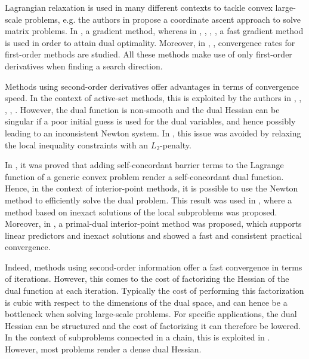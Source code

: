 
Lagrangian relaxation is used in many different contexts to tackle convex large-scale problems, e.g. the authors in \cite{Cottle1986} propose a coordinate ascent approach to solve matrix problems. In \cite{Lasdon1970}, \cite{Giselsson2010} a gradient method, whereas in \cite{Richter2011}, \cite{Necoara2011}, \cite{Giselsson2013}, \cite{Giselsson2014a}, \cite{Giselsson2014b} a fast gradient method is used in order to attain dual optimality. Moreover, in \cite{Necoara2014a}, \cite{Necoara2014b}, convergence rates for first-order methods are studied. All these methods make use of only first-order derivatives when finding a search direction.

Methods using second-order derivatives offer advantages in terms of convergence speed. In the context of active-set methods, this is exploited by the authors in \cite{Ferreau2012b}, \cite{Kozma2013a}, \cite{Kozma2014a}, \cite{Frasch2014}, \cite{Gros2014a}. However, the dual function is non-smooth and the dual Hessian can be singular if a poor initial guess is used for the dual variables, and hence possibly leading to an inconsistent Newton system. In \cite{Kozma2014a}, this issue was avoided by relaxing the local inequality constraints with an $L_2$-penalty.

In \cite{Necoara2009a}, it was proved that adding self-concordant barrier terms to the Lagrange function of a generic convex problem render a self-concordant dual function. Hence, in the context of interior-point methods, it is possible to use the Newton method to efficiently solve the dual problem. This result was used in \cite{Quoc2013}, where a method based on inexact solutions of the local subproblems was proposed. Moreover, in \cite{Klintberg2014}, a primal-dual interior-point method was proposed, which supports linear predictors and inexact solutions and showed a fast and consistent practical convergence.

Indeed, methods using second-order information offer a fast convergence in terms of iterations. However, this comes to the cost of factorizing the Hessian of the dual function at each iteration. Typically the cost of performing this factorization is cubic with respect to the dimensions of the dual space, and can hence be a bottleneck when solving large-scale problems. For specific applications, the dual Hessian can be structured and the cost of factorizing it can therefore be lowered. In the context of subproblems connected in a chain, this is exploited in \cite{Frasch2014}. However, most problems render a dense dual Hessian.

